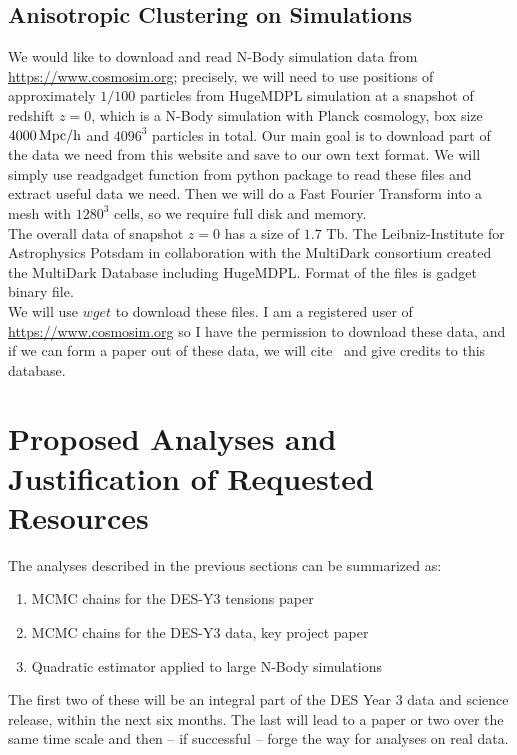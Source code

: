 \documentclass[12pt]{article}
\begin{document}
\begin{small}

\subsection{Anisotropic Clustering on Simulations}
We would like to download and read N-Body simulation data from \url{https://www.cosmosim.org}; precisely, we will need to use positions of approximately $1/100$ particles from HugeMDPL simulation at a snapshot of redshift $z=0$, which is a N-Body simulation with Planck cosmology, box size $4000 \, \rm  Mpc/h$ and $4096^3$ particles in total. Our main goal is to download part of the data we need from this website and save to our own text format. We will simply use readgadget function from python package to read these files and extract useful data we need. Then we will do a Fast Fourier Transform into a mesh with $1280^3$ cells, so we require full disk and memory.\\
The overall data of snapshot $z=0$ has a size of $1.7$ Tb. The Leibniz-Institute for Astrophysics Potsdam in collaboration with the MultiDark consortium created the MultiDark Database including HugeMDPL. Format of the files is gadget binary file. \\
We will use $wget$ to download these files. I am a registered user of \url{https://www.cosmosim.org} so I have the permission to download these data, and if we can form a paper out of these data, we will cite~\cite{Klypin:2016kl} and give credits to this database.


\section{Proposed Analyses and Justification of Requested Resources}

The analyses described in the previous sections can be summarized as:
\begin{enumerate}
\item MCMC chains for the DES-Y3 tensions paper
\item MCMC chains for the DES-Y3 data, key project paper
\item Quadratic estimator applied to large N-Body simulations
\end{enumerate}
The first two of these will be an integral part of the DES Year 3 data and science release, within the next six months. The last will lead to a paper or two over the same time scale and then -- if successful -- forge the way for analyses on real data.


\end{small}
\end{document}
